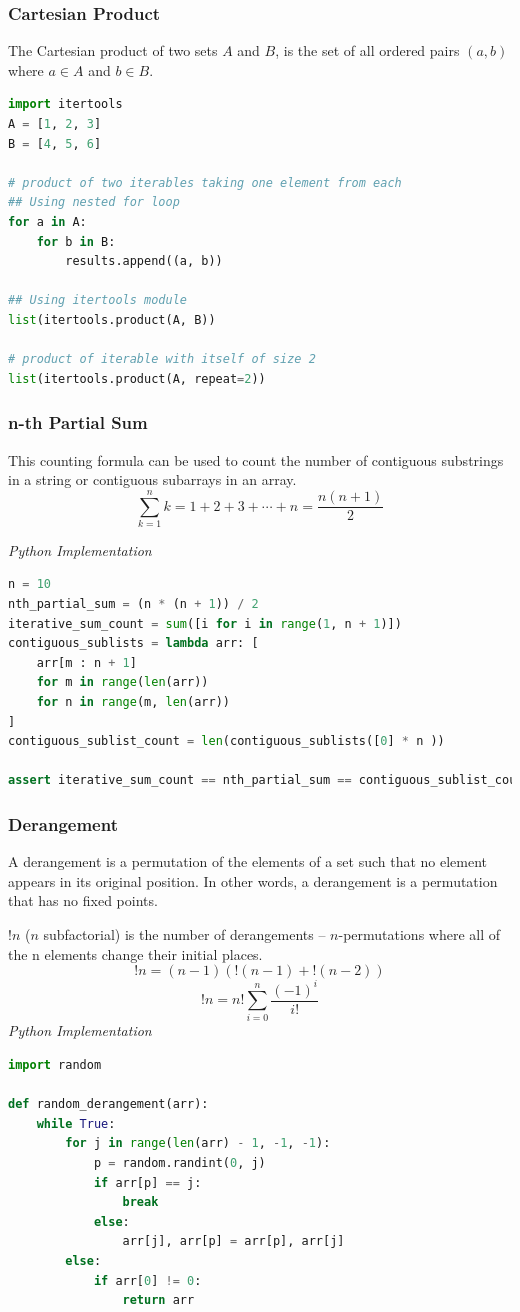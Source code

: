 \documentclass{article}
\begin{document}
    \subsubsection{Cartesian Product}
    The Cartesian product of two sets $A$ and $B$, is the set of all ordered pairs $(a, b)$ where $a \in A$ and $b \in B$.

\begin{lstlisting}[language=Python]
import itertools
A = [1, 2, 3]
B = [4, 5, 6]

# product of two iterables taking one element from each
## Using nested for loop
for a in A: 
    for b in B:
        results.append((a, b))

## Using itertools module
list(itertools.product(A, B))

# product of iterable with itself of size 2
list(itertools.product(A, repeat=2))
\end{lstlisting}

    \subsubsection{n-th Partial Sum}
    This counting formula can be used to count the number of contiguous substrings in a string or contiguous subarrays in an array.
    \[
        \sum_{k=1}^n k = 1 + 2 + 3 + \cdots + n = \frac{n(n+1)}{2} 
    \]
    
\vspace{8pt} \emph{Python Implementation}
\begin{lstlisting}[language=Python]
n = 10
nth_partial_sum = (n * (n + 1)) / 2 
iterative_sum_count = sum([i for i in range(1, n + 1)])
contiguous_sublists = lambda arr: [
    arr[m : n + 1] 
    for m in range(len(arr)) 
    for n in range(m, len(arr))
]
contiguous_sublist_count = len(contiguous_sublists([0] * n ))

assert iterative_sum_count == nth_partial_sum == contiguous_sublist_count
\end{lstlisting}

    \subsubsection{Derangement}
    A derangement is a permutation of the elements of a set such that no element appears in its original position. In other words, a derangement is a permutation that has no fixed points.
    
    $!n$ ($n$ subfactorial) is the number of derangements -- $n$-permutations where all of the n elements change their initial places.
    \[
        !n=(n-1)({!(n-1)}+{!(n-2)})
    \]
    \[
        !n=n!\sum_{i=0}^{n}{\frac {(-1)^{i}}{i!}}
    \]
\vspace{8pt} \emph{Python Implementation}
\begin{lstlisting}[language=Python]
import random

def random_derangement(arr):
    while True:
        for j in range(len(arr) - 1, -1, -1):
            p = random.randint(0, j)
            if arr[p] == j:
                break
            else:
                arr[j], arr[p] = arr[p], arr[j]
        else:
            if arr[0] != 0:
                return arr
\end{lstlisting}
\end{document}
